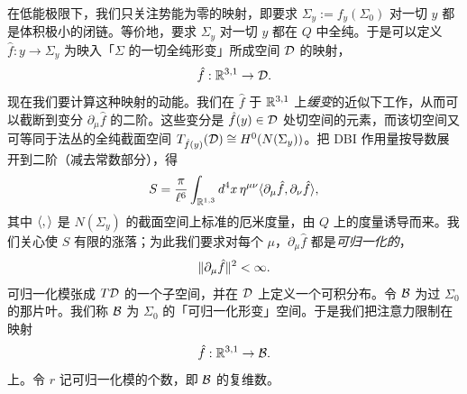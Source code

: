 在低能极限下，我们只关注势能为零的映射，即要求 $\Sigma_y := f_y(\Sigma_0)$ 对一切 $y$ 都是体积极小的闭链。等价地，要求 $\Sigma_y$ 对一切 $y$ 都在 $Q$ 中全纯。于是可以定义 $\hat f: y\to \Sigma_y$ 为映入「$\Sigma$ 的一切全纯形变」所成空间 $\mathcal{D}$ 的映射，
\begin{equation}
\hat f: \mathbb{R}^{3,1} \to \mathcal{D}.
\end{equation}
现在我们要计算这种映射的动能。我们在 $\hat f$ 于 $\mathbb{R}^{3,1}$ 上\emph{缓变}的近似下工作，从而可以截断到变分 $\partial_\mu \hat f$ 的二阶。这些变分是 $\hat f(y) \in \mathcal{D}$ 处切空间的元素，而该切空间又可等同于法丛的全纯截面空间 $T_{\hat f(y)}(\mathcal{D}) \cong H^0(N(\Sigma_y))$。把 DBI 作用量按导数展开到二阶（减去常数部分），得
\begin{equation} \label{eq:KK-volume}
S = \frac{\pi}{\ell^6} \int_{\mathbb{R}^{1,3}} d^4x \, \eta^{\mu\nu}
\langle \partial_\mu \hat f, \partial_\nu \hat f \rangle,
\end{equation}
其中 $\langle , \rangle$ 是 $N(\Sigma_y)$ 的截面空间上标准的厄米度量，由 $Q$ 上的度量诱导而来。我们关心使 $S$ 有限的涨落；为此我们要求对每个 $\mu$，$\partial_\mu \hat f$ 都是\emph{可归一化的}，
\begin{equation}
\lVert \partial_\mu \hat f \rVert^2 < \infty.
\end{equation}
可归一化模张成 $T\mathcal{D}$ 的一个子空间，并在 $\mathcal{D}$ 上定义一个可积分布。令 $\mathcal{B}$ 为过 $\Sigma_0$ 的那片叶。我们称 $\mathcal{B}$ 为 $\Sigma_0$ 的「可归一化形变」空间。于是我们把注意力限制在映射
\begin{equation}
\hat f: \mathbb{R}^{3,1} \to \mathcal{B}.
\end{equation}
上。令 $r$ 记可归一化模的个数，即 $\mathcal{B}$ 的复维数。

